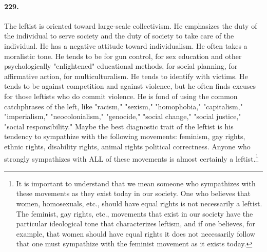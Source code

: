 \documentclass[12pt]{book}
\begin{document}
\paragraph{229.} The leftist is oriented toward large-scale collectivism. He emphasizes the duty of the individual to serve society and the duty of society to take care of the individual. He has a negative attitude toward individualism. He often takes a moralistic tone. He tends to be for gun control, for sex education and other psychologically "enlightened" educational methods, for social planning, for affirmative action, for multiculturalism. He tends to identify with victims. He tends to be against competition and against violence, but he often finds excuses for those leftists who do commit violence. He is fond of using the common catchphrases of the left, like "racism," "sexism," "homophobia," "capitalism," "imperialism," "neocolonialism," "genocide," "social change," "social justice," "social responsibility." Maybe the best diagnostic trait of the leftist is his tendency to sympathize with the following movements: feminism, gay rights, ethnic rights, disability rights, animal rights political correctness.  Anyone who strongly sympathizes with ALL of these movements is almost certainly a leftist.\footnote{It is important to understand that we mean someone who sympathizes with these movements as they exist today in our society. One who believes that women, homosexuals, etc., should have equal rights is not necessarily a leftist. The feminist, gay rights, etc., movements that exist in our society have the particular ideological tone that characterizes leftism, and if one believes, for example, that women should have equal rights it does not necessarily follow that one must sympathize with the feminist movement as it exists today.}
\end{document}
